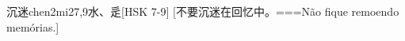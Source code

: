 \begin{EntryWithPhonetic}{沉迷}{chen2mi2}{7,9}{⽔、⾡}[HSK 7-9]
  [不要沉迷在回忆中。===Não fique remoendo memórias.]
\end{EntryWithPhonetic}
